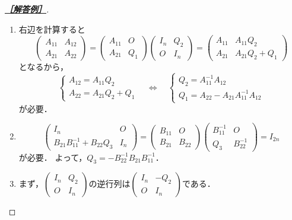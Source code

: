 \documentclass[uplatex,dvipdfmx]{jsarticle}
\begin{document}
\begin{proof}[\textbf{\underline{［解答例］}}]\mbox{}
    \begin{enumerate}
        \item 右辺を計算すると
        \[\begin{pmatrix}
            A_{11}&A_{12}\\A_{21}&A_{22}
        \end{pmatrix}=\begin{pmatrix}A_{11}&O\\A_{21}&Q_1\end{pmatrix}\begin{pmatrix}I_n&Q_2\\O&I_n\end{pmatrix}=\begin{pmatrix}A_{11}&A_{11}Q_2\\A_{21}&A_{21}Q_2+Q_1\end{pmatrix}\]
        となるから，
        \[\begin{cases}
            A_{12}=A_{11}Q_2\\
            A_{22}=A_{21}Q_2+Q_1
        \end{cases}\quad\Leftrightarrow\quad 
        \begin{cases}
            Q_2=A_{11}^{-1}A_{12}\\
            Q_1=A_{22}-A_{21}A_{11}^{-1}A_{12}
        \end{cases}
        \]
        が必要．
        \item 
        \[\begin{pmatrix}I_n&O\\B_{21}B_{11}^{-1}+B_{22}Q_3&I_n\end{pmatrix}=\begin{pmatrix}
            B_{11}&O\\B_{21}&B_{22}
        \end{pmatrix}\begin{pmatrix}B_{11}^{-1}&O\\Q_3&B_{22}^{-1}\end{pmatrix}=I_{2n}\]
        が必要．
        よって，$Q_3=-B_{22}^{-1}B_{21}B_{11}^{-1}$．
        \item まず，$\begin{pmatrix}I_n&Q_2\\O&I_n\end{pmatrix}$の逆行列は$\begin{pmatrix}I_n&-Q_2\\O&I_n\end{pmatrix}$である．

\end{enumerate}
\end{proof}
\end{document}
